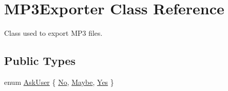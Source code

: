 \hypertarget{class_m_p3_exporter}{}\section{M\+P3\+Exporter Class Reference}
\label{class_m_p3_exporter}


Class used to export M\+P3 files.  


\subsection*{Public Types}
\begin{DoxyCompactItemize}
\item 
enum \hyperlink{class_m_p3_exporter_af8a5ef69533b7ea5f45024f0af4e6e3d}{Ask\+User} \{ \hyperlink{class_m_p3_exporter_af8a5ef69533b7ea5f45024f0af4e6e3daf9b2e90e90eb5e715355e20d424375c4}{No}, 
\hyperlink{class_m_p3_exporter_af8a5ef69533b7ea5f45024f0af4e6e3dab63ed812f27357f7fd8061331b1b38c7}{Maybe}, 
\hyperlink{class_m_p3_exporter_af8a5ef69533b7ea5f45024f0af4e6e3da5da716215ab5cc34419eebb9e252f54c}{Yes}
 \}
\end{DoxyCompactItemize}
